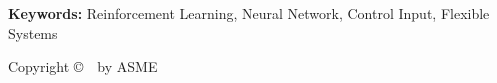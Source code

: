 {{\vspace{10pt}
{\bf Keywords:} Reinforcement Learning, Neural Network, Control Input, Flexible Systems




}}

\vspace{\fill}
{\scriptsize{\hv
\begin{flushbottom}
\begin{flushright}
Copyright \copyright\ \confyear\ by ASME
\end{flushright}
\end{flushbottom}
}}






